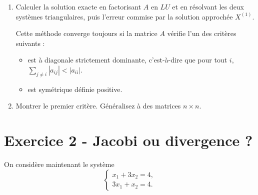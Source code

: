 \begin{enumerate}
{\begin{solution}
        \end{solution}
    }{}

    \item Calculer la solution exacte en factorisant $A$ en $LU$ et en résolvant les deux systèmes triangulaires, puis l'erreur commise par la solution approchée $X^{(1)}$.
    \vspace{1em}

    Cette méthode converge toujours si la matrice $A$ vérifie l'un des critères suivants : 
    \begin{itemize}
        \item[$\bullet$] est à diagonale strictement dominante, c'est-à-dire que pour tout $i$, $\sum_{j \neq i} |a_{ij}| < |a_{ii}|$.
        \item[$\bullet$] est symétrique définie positive.
    \end{itemize}
    \item Montrer le premier critère. Généralisez à des matrices $n \times n$.
\end{enumerate}

\vspace{2em}

\section*{Exercice 2 - Jacobi ou divergence ?}
On considère maintenant le système
\[
\begin{cases}
x_1+3x_2=4,\\
3x_1+x_2=4.
\end{cases}
\]

